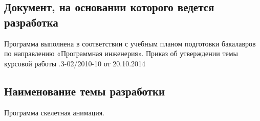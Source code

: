 \subsection{Документ, на основании которого ведется разработка}
Программа выполнена в соответствии с учебным планом подготовки бакалавров по направлению «Программная инженерия». Приказ об утверждении темы курсовой работы .3-02/2010-10 от 20.10.2014


\subsection{Наименование темы разработки}
Программа скелетная анимация.